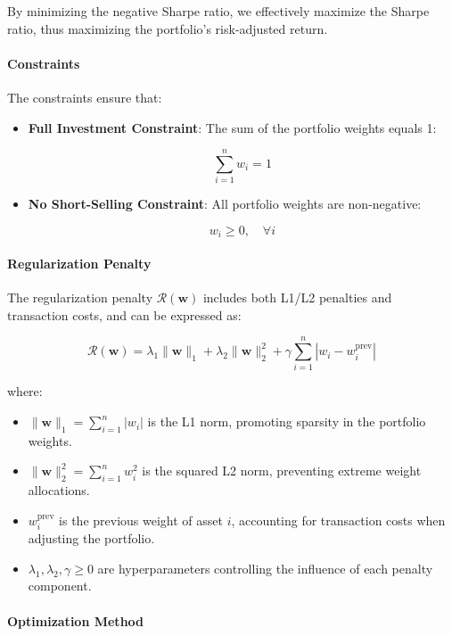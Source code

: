 By minimizing the negative Sharpe ratio, we effectively maximize the Sharpe ratio, thus maximizing the portfolio's risk-adjusted return.

\paragraph{Constraints}

The constraints ensure that:

\begin{itemize}
    \item \textbf{Full Investment Constraint}: The sum of the portfolio weights equals 1:

    \[
    \sum_{i=1}^n w_i = 1
    \]

    \item \textbf{No Short-Selling Constraint}: All portfolio weights are non-negative:

    \[
    w_i \geq 0, \quad \forall i
    \]
\end{itemize}

\paragraph{Regularization Penalty}

The regularization penalty \( \mathcal{R}(\mathbf{w}) \) includes both L1/L2 penalties and transaction costs, and can be expressed as:

\[
\mathcal{R}(\mathbf{w}) = \lambda_1 \|\mathbf{w}\|_1 + \lambda_2 \|\mathbf{w}\|_2^2 + \gamma \sum_{i=1}^n |w_i - w_i^{\text{prev}}|
\]

where:

\begin{itemize}
    \item \( \|\mathbf{w}\|_1 = \sum_{i=1}^n |w_i| \) is the L1 norm, promoting sparsity in the portfolio weights.
    \item \( \|\mathbf{w}\|_2^2 = \sum_{i=1}^n w_i^2 \) is the squared L2 norm, preventing extreme weight allocations.
    \item \( w_i^{\text{prev}} \) is the previous weight of asset \( i \), accounting for transaction costs when adjusting the portfolio.
    \item \( \lambda_1, \lambda_2, \gamma \geq 0 \) are hyperparameters controlling the influence of each penalty component.
\end{itemize}

\paragraph{Optimization Method}

